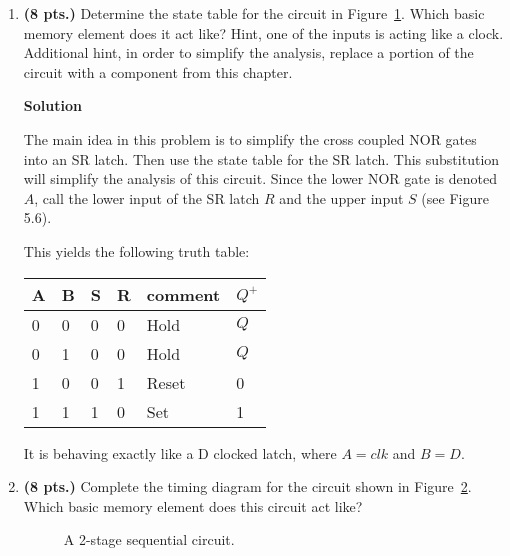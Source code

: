 \begin{enumerate}
    \item \textbf{ (8 pts.)} Determine the state table for the circuit
        in Figure~\ref{fig:sequentialCirDLatch}.  Which basic memory element does it act
        like?  Hint, one of the inputs is acting like a clock.  Additional
        hint, in order to simplify the analysis, replace a portion of the
        circuit with a component from this chapter.
        \begin{figure}[ht]
            \caption{}
            \label{fig:sequentialCirDLatch}
        \end{figure}

        \begin{onlysolution}  \textbf{Solution} \itshape{
                The main idea in this problem is to simplify the cross coupled NOR gates into
                an SR latch.  Then use the state table for the SR latch.  This substitution
                will simplify the analysis of this circuit.  Since the lower NOR gate is denoted
                $A$, call the lower input of the SR latch $R$ and the upper input $S$
                (see Figure 5.6).

                This yields the following truth table:

                \begin{tabular}{l|l|l|l|l||l}
                    A & B & S & R & comment & $Q^+$ \\ \hline
                    0 & 0 & 0 & 0 & Hold    & $Q$   \\ \hline
                    0 & 1 & 0 & 0 & Hold    & $Q$   \\ \hline
                    1 & 0 & 0 & 1 & Reset   & 0     \\ \hline
                    1 & 1 & 1 & 0 & Set     & 1     \\
                \end{tabular}

                It is behaving exactly like a D clocked latch, where $A=clk$ and $B=D$.
            }
        \end{onlysolution}

    \item \textbf{ (8 pts.)} Complete the timing diagram for the circuit
        shown in Figure~\ref{fig:sequentialCirDMS}.  Which basic memory element
        does this circuit act like?

        \begin{figure}[ht]
            \label{fig:sequentialCirnand}
            \caption{A 2-stage sequential circuit.}
            \label{fig:sequentialCirDMS}
        \end{figure}


\end{enumerate}
